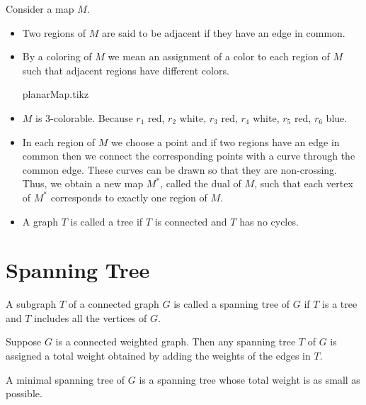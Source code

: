 \documentclass[../main-sheet.tex]{subfiles}
\begin{document}
Consider a map $M$.
\begin{itemize}
    \item Two regions of $ M $ are said to be adjacent if they have an edge in common.
    \item By a coloring of $ M $ we mean an assignment of a color to each region of $ M $ such that adjacent regions have different colors.
    \begin{center}
        {planarMap.tikz}    
    \end{center}
    \item $ M $ is 3-colorable. Because $ r_1 $ red, $ r_2 $ white, $ r_3 $ red, $ r_4 $ white, $ r_5 $ red, $ r_6 $ blue.
    \item In each region of $ M $ we choose a point and if two regions have an edge in common then we connect the corresponding points with a curve through the common edge. These curves can be drawn so that they are non-crossing. Thus, we obtain a new map $ M^* $, called the dual of $ M $, such that each vertex of $ M^* $ corresponds to exactly one region of $ M $.
    \item A graph $ T $ is called a tree if $ T $ is connected and $ T $ has no cycles.
\end{itemize}
\section{Spanning Tree}
A subgraph $ T $ of a connected graph $ G $ is called a spanning tree of $ G $ if $ T $ is a tree and $ T $ includes all the vertices of $ G $.

Suppose $ G $ is a connected weighted graph. Then any spanning tree $ T $ of $ G $ is assigned a total weight obtained by adding the weights of the edges in $ T $.

A minimal spanning tree of $ G $ is a spanning tree whose total weight is as small as possible.
\end{document}

